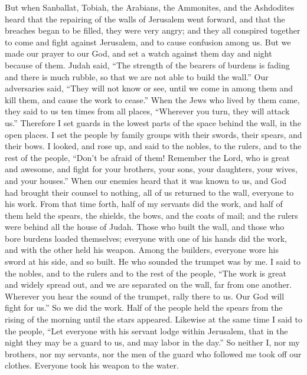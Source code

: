  But when Sanballat, Tobiah, the Arabians, the Ammonites,
and the Ashdodites heard that the repairing of the walls of Jerusalem
went forward, and that the breaches began to be filled, they were very
angry;  and they all conspired together to come and fight
against Jerusalem, and to cause confusion among us.  But
we made our prayer to our God, and set a watch against them day and
night because of them.  Judah said, ``The strength of the
bearers of burdens is fading and there is much rubble, so that we are
not able to build the wall.''  Our adversaries said,
``They will not know or see, until we come in among them and kill them,
and cause the work to cease.''  When the Jews who lived
by them came, they said to us ten times from all places, ``Wherever you
turn, they will attack us.''  Therefore I set guards in
the lowest parts of the space behind the wall, in the open places. I set
the people by family groups with their swords, their spears, and their
bows.  I looked, and rose up, and said to the nobles, to
the rulers, and to the rest of the people, ``Don't be afraid of them!
Remember the Lord, who is great and awesome, and fight for your
brothers, your sons, your daughters, your wives, and your houses.''
 When our enemies heard that it was known to us, and God
had brought their counsel to nothing, all of us returned to the wall,
everyone to his work.  From that time forth, half of my
servants did the work, and half of them held the spears, the shields,
the bows, and the coats of mail; and the rulers were behind all the
house of Judah.  Those who built the wall, and those who
bore burdens loaded themselves; everyone with one of his hands did the
work, and with the other held his weapon.  Among the
builders, everyone wore his sword at his side, and so built. He who
sounded the trumpet was by me.  I said to the nobles, and
to the rulers and to the rest of the people, ``The work is great and
widely spread out, and we are separated on the wall, far from one
another.  Wherever you hear the sound of the trumpet,
rally there to us. Our God will fight for us.''  So we
did the work. Half of the people held the spears from the rising of the
morning until the stars appeared.  Likewise at the same
time I said to the people, ``Let everyone with his servant lodge within
Jerusalem, that in the night they may be a guard to us, and may labor in
the day.''  So neither I, nor my brothers, nor my
servants, nor the men of the guard who followed me took off our clothes.
Everyone took his weapon to the water.

